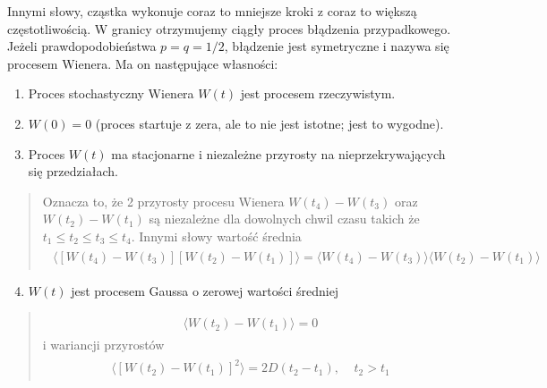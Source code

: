 \documentclass[a4paper,12pt,polish]{sphinxmanual}
\begin{document}
Innymi słowy, cząstka wykonuje coraz to mniejsze kroki z coraz to większą częstotliwością. W granicy otrzymujemy ciągły proces błądzenia przypadkowego. Jeżeli prawdopodobieństwa $p=q=1/2$, błądzenie jest symetryczne i nazywa się procesem Wienera. Ma on następujące własności:
\begin{enumerate}
\item {} 
Proces stochastyczny Wienera $W(t)$ jest procesem rzeczywistym.

\item {} 
$W(0)=0$ (proces startuje z zera, ale to nie jest istotne; jest to wygodne).

\item {} 
Proces $W(t)$ ma stacjonarne i niezależne przyrosty na nieprzekrywających się przedziałach.

\end{enumerate}
\begin{quote}

Oznacza to, że 2 przyrosty procesu Wienera $W(t_4) - W(t_3)$ oraz $W(t_2) - W(t_1)$ są niezależne dla dowolnych chwil czasu takich że $t_1 \le t_2 \le t_3 \le t_4$. Innymi słowy wartość średnia
\label{ch3/chIII021:equation-eqn7}\begin{gather}
\begin{split}\langle [W(t_4) - W(t_3)] [W(t_2) - W(t_1)] \rangle = \langle W(t_4) - W(t_3)\rangle\langle W(t_2) - W(t_1)\rangle\end{split}\label{ch3/chIII021-eqn7}
\end{gather}\end{quote}
\begin{enumerate}
\setcounter{enumi}{3}
\item {} 
$W(t)$ jest procesem Gaussa o zerowej wartości średniej

\end{enumerate}
\begin{quote}
\label{ch3/chIII021:equation-eqn8}\begin{gather}
\begin{split}\langle W(t_2) - W(t_1) \rangle = 0\end{split}\label{ch3/chIII021-eqn8}
\end{gather}
i wariancji przyrostów
\label{ch3/chIII021:equation-eqn9}\begin{gather}
\begin{split}\langle [W(t_2) - W(t_1)]^2 \rangle = 2D(t_2 - t_1), \; \; \; \; t_2 > t_1\end{split}\label{ch3/chIII021-eqn9}
\end{gather}\end{quote}
\end{document}
